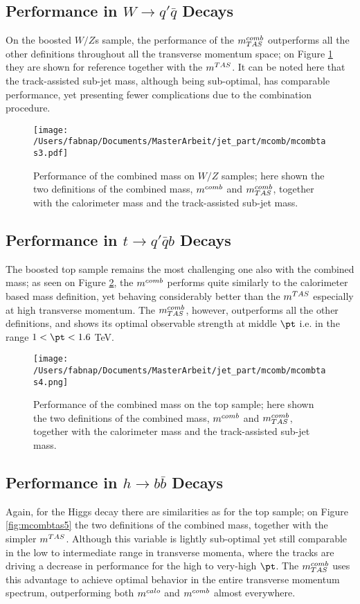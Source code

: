 \subsection{Performance in $W \to q'\bar{q}$ Decays}
On the boosted $W/Z$s sample, the performance of the $\mcombtas$ outperforms all the other definitions throughout all the transverse momentum space; on Figure \ref{fig:mcombtas3} they are shown for reference together with the $m^{TAS}$. It can be noted here that the track-assisted sub-jet mass, although being sub-optimal, has comparable performance, yet presenting fewer complications due to the combination procedure.

\begin{figure}[!ht]
  \centering
      \texttt{[image: /Users/fabnap/Documents/MasterArbeit/jet\_part/mcomb/mcombtas3.pdf]}
  \caption[$\mcombtas$ on the boosted $W/Z$]{Performance of the combined mass on $W/Z$ samples; here shown the two definitions of the combined mass, $m^{comb}$ and $\mcombtas$, together with the calorimeter mass and the track-assisted sub-jet mass.}
  \label{fig:mcombtas3}
\end{figure}


\subsection{Performance in $t\to q'\bar{q}b$ Decays}
The boosted top sample remains the most challenging one also with the combined mass; as seen on Figure \ref{fig:mcombtas4}, the $m^{comb}$ performs quite similarly to the calorimeter based mass definition, yet behaving considerably better than the $m^{TAS}$ especially at high transverse momentum. The $\mcombtas$, however, outperforms all the other definitions, and shows its optimal observable strength at middle $\pt$ i.e. in the range $1< \pt < 1.6$ TeV.

\begin{figure}[!ht]
  \centering
      \texttt{[image: /Users/fabnap/Documents/MasterArbeit/jet\_part/mcomb/mcombtas4.png]}
  \caption[$\mcombtas$ on the boosted tops]{Performance of the combined mass on the top sample; here shown the two definitions of the combined mass, $m^{comb}$ and $\mcombtas$, together with the calorimeter mass and the track-assisted sub-jet mass.}
  \label{fig:mcombtas4}
\end{figure}

\subsection{Performance in $h\to b\bar{b}$ Decays}
Again, for the Higgs decay there are similarities as for the top sample; on Figure \ref{fig:mcombtas5} the two definitions of the combined mass, together with the simpler $m^{TAS}$. Although this variable is lightly sub-optimal yet still comparable in the low to intermediate range in transverse momenta, where the tracks are driving a decrease in performance for the high to very-high $\pt$. The $\mcombtas$ uses this advantage to achieve optimal behavior in the entire transverse momentum spectrum, outperforming both $m^{calo}$ and $m^{comb}$ almost everywhere.


